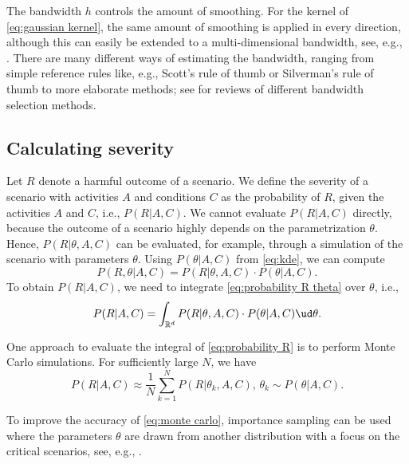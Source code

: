 The bandwidth $h$ controls the amount of smoothing. For the kernel of \cref{eq:gaussian kernel}, the same amount of smoothing is applied in every direction, although this can easily be extended to a multi-dimensional bandwidth, see, e.g., \cite{scott2005multidimensional, chen2017tutorial}. There are many different ways of estimating the bandwidth, ranging from simple reference rules like, e.g., Scott's rule of thumb \cite{scott2015multivariate} or Silverman's rule of thumb \cite{silverman1986density} to more elaborate methods; see \cite{turlach1993bandwidthselection, bashtannyk2001bandwidth, jones1996brief, chiu1996comparative} for reviews of different bandwidth selection methods. 



\subsection{Calculating severity}
\label{sec:simulations}

Let $R$ denote a harmful outcome of a scenario. We define the severity of a scenario with activities $A$ and conditions $C$ as the probability of $R$, given the activities $A$ and $C$, i.e., $P(R|A,C)$. We cannot evaluate $P(R|A,C)$ directly, because the outcome of a scenario highly depends on the parametrization $\theta$. Hence, $P(R|\theta,A,C)$ can be evaluated, for example, through a simulation of the scenario with parameters $\theta$. Using $P(\theta|A,C)$ from \cref{eq:kde}, we can compute 
\begin{equation} \label{eq:probability R theta}
	P(R,\theta|A,C) = P(R|\theta,A,C) \cdot P(\theta|A,C).
\end{equation}
To obtain $P(R|A,C)$, we need to integrate \cref{eq:probability R theta} over $\theta$, i.e., 
\begin{equation} \label{eq:probability R}
	P(R|A,C) = \int_{\mathbb{R}^d} P(R|\theta,A,C) \cdot P(\theta|A,C) \ud \theta.
\end{equation}

One approach to evaluate the integral of \cref{eq:probability R} is to perform Monte Carlo simulations. For sufficiently large $N$, we have
\begin{equation} \label{eq:monte carlo}
	P(R|A,C) \approx \frac{1}{N} \sum_{k=1}^N P(R|\theta_k,A,C), \, \theta_k \sim P(\theta|A,C).
\end{equation}

To improve the accuracy of \cref{eq:monte carlo}, importance sampling can be used where the parameters $\theta$ are drawn from another distribution with a focus on the critical scenarios, see, e.g., \cite{deGelder2017assessment}.



